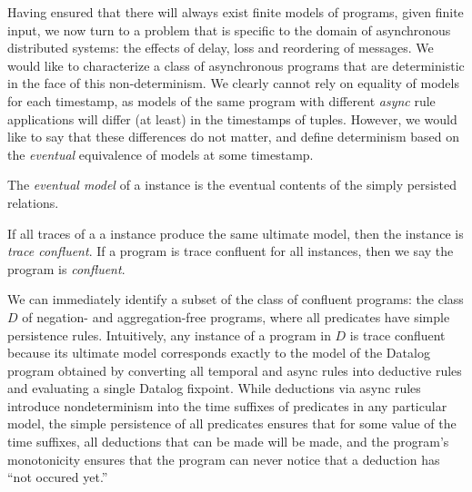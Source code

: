 Having ensured that there will always exist finite models of \lang programs, given finite input, we now turn to a problem that is specific to the domain of asynchronous
distributed systems: the effects of delay, loss and reordering of messages. We would like to
characterize a class of asynchronous \lang programs that are deterministic in the face of this non-determinism.  
We clearly cannot rely on equality of models for each timestamp, as models of the same program with different {\em async} rule applications will differ
(at least) in the timestamps of tuples.  However, we would like to say that these differences do not matter, and define determinism based on the {\em eventual} equivalence of models at some timestamp.

\begin{definition}
The \emph{eventual model} of a \lang instance is the eventual contents of the simply persisted relations.
\end{definition}

If all traces  of a a \lang instance produce the same ultimate model, then the instance is {\em trace confluent}.  If a program is trace confluent for all instances, then we say the program is {\em confluent}.

We can immediately identify a subset of the class of confluent programs:
the class $D$ of negation- and aggregation-free \lang programs, where all predicates have simple persistence rules.  Intuitively, any instance of a program in $D$ is trace confluent because its ultimate model corresponds exactly to the
model of the Datalog program obtained by converting all temporal and async rules into deductive rules and evaluating a single Datalog fixpoint.  While deductions via async
rules introduce nondeterminism into the time suffixes of predicates in any particular model, 
the simple persistence of all predicates ensures that for some value of the time suffixes, 
all deductions that can be made will be made, and the program's monotonicity ensures that
the program can never notice that a deduction has ``not occured yet.''

